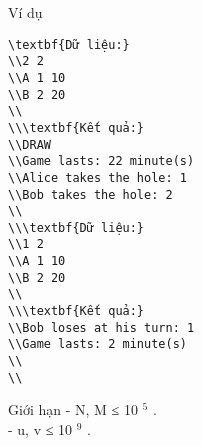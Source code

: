 Ví dụ
\begin{verbatim}
\textbf{Dữ liệu:}
\\2 2
\\A 1 10
\\B 2 20
\\
\\\textbf{Kết quả:}
\\DRAW
\\Game lasts: 22 minute(s)
\\Alice takes the hole: 1
\\Bob takes the hole: 2
\\
\\\textbf{Dữ liệu:}
\\1 2
\\A 1 10
\\B 2 20
\\
\\\textbf{Kết quả:}
\\Bob loses at his turn: 1
\\Game lasts: 2 minute(s)
\\
\\\end{verbatim}
Giới hạn
- N, M ≤ 10   $^    5   $   .   
\\   - u, v ≤ 10   $^    9   $   .